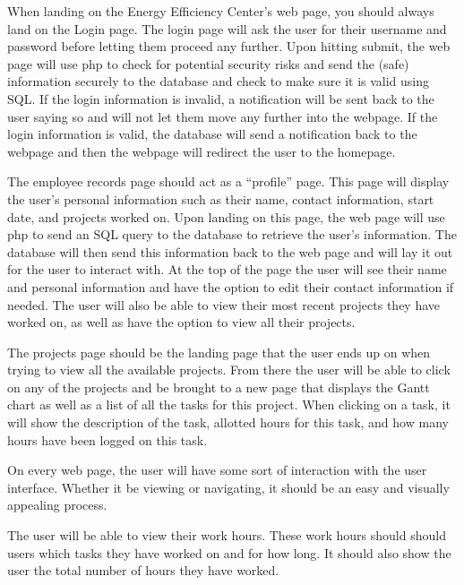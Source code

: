 \documentclass[letterpaper,10pt,titlepage,journal,compsoc,draftclsnofoot,onecolumn]{IEEEtran}
\newcommand\tab[1][1cm]{\hspace*{#1}}
\begin{document}
\tab When landing on the Energy Efficiency Center's web page, you should always land on the Login page. The login page will ask the user for their username and password before letting them proceed any further. Upon hitting submit, the web page will use php to check for potential security risks and send the (safe) information securely to the database and check to make sure it is valid using SQL. If the login information is invalid, a notification will be sent back to the user saying so and will not let them move any further into the webpage. If the login information is valid, the database will send a notification back to the webpage and then the webpage will redirect the user to the homepage.\newline


\tab The employee records page should act as a “profile” page. This page will display the user's personal information such as their name, contact information, start date, and projects worked on. Upon landing on this page, the web page will use php to send an SQL query to the database to retrieve the user's information. The database will then send this information back to the web page and will lay it out for the user to interact with. At the top of the page the user will see their name and personal information and have the option to edit their contact information if needed. The user will also be able to view their most recent projects they have worked on, as well as have the option to view all their projects.  \newline


\tab The projects page should be the landing page that the user ends up on when trying to view all the available projects. From there the user will be able to click on any of the projects and be brought to a new page that displays the Gantt chart as well as a list of all the tasks for this project. When clicking on a task, it will show the description of the task, allotted hours for this task, and how many hours have been logged on this task. \newline


\tab On every web page, the user will have some sort of interaction with the user interface. Whether it be viewing or navigating, it should be an easy and visually appealing process. \newline


\tab The user will be able to view their work hours. These work hours should should users which tasks they have worked on and for how long. It should also show the user the total number of hours they have worked. \newline
\end{document}
